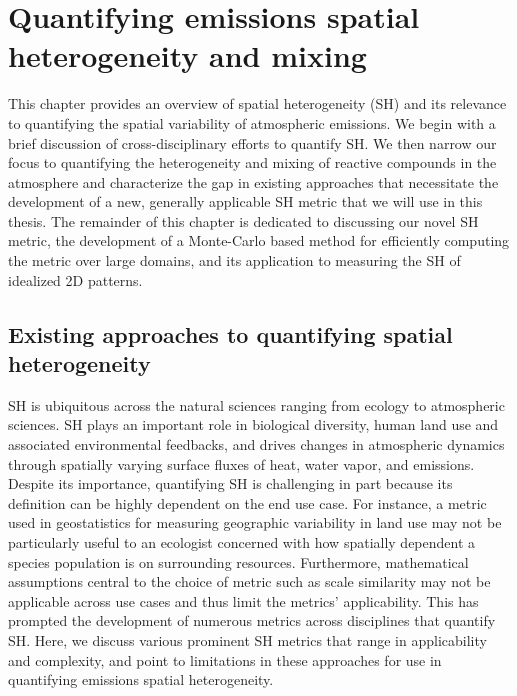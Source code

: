 \chapter{Quantifying emissions spatial heterogeneity and mixing}

This chapter provides an overview of spatial heterogeneity (SH) and its relevance to quantifying the spatial variability of atmospheric emissions. We begin with a brief discussion of cross-disciplinary efforts to quantify SH. We then narrow our focus to quantifying the heterogeneity and mixing of reactive compounds in the atmosphere and characterize the gap in existing approaches that necessitate the development of a new, generally applicable SH metric that we will use in this thesis. The remainder of this chapter is dedicated to discussing our novel SH metric, the development of a Monte-Carlo based method for efficiently computing the metric over large domains, and its application to measuring the SH of idealized 2D patterns.  

\section{Existing approaches to quantifying spatial heterogeneity}\label{existing-sh-metrics}
SH is ubiquitous across the natural sciences ranging from ecology to atmospheric sciences. SH plays an important role in biological diversity, human land use and associated environmental feedbacks, and drives changes in atmospheric dynamics through spatially varying surface fluxes of heat, water vapor, and emissions. Despite its importance, quantifying SH is challenging in part because its definition can be highly dependent on the end use case. For instance, a metric used in geostatistics for measuring geographic variability in land use may not be particularly useful to an ecologist concerned with how spatially dependent a species population is on surrounding resources. Furthermore, mathematical assumptions central to the choice of metric such as scale similarity may not be applicable across use cases and thus limit the metrics' applicability. This has prompted the development of numerous metrics across disciplines that quantify SH. Here, we discuss various prominent SH metrics that range in applicability and complexity, and point to limitations in these approaches for use in quantifying emissions spatial heterogeneity. 

